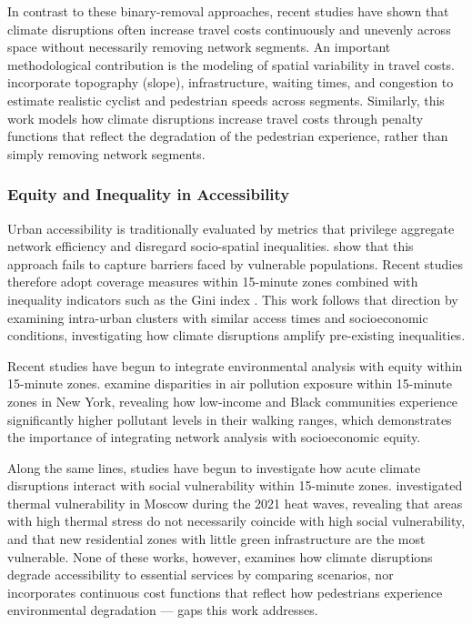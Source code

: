 In contrast to these binary-removal approaches, recent studies have shown that climate disruptions often increase travel costs continuously and unevenly across space without necessarily removing network segments. An important methodological contribution is the modeling of spatial variability in travel costs. \cite{PRITCHARD2019386} incorporate topography (slope), infrastructure, waiting times, and congestion to estimate realistic cyclist and pedestrian speeds across segments. Similarly, this work models how climate disruptions increase travel costs through penalty functions that reflect the degradation of the pedestrian experience, rather than simply removing network segments.

\subsubsection{Equity and Inequality in Accessibility}

Urban accessibility is traditionally evaluated by metrics that privilege aggregate network efficiency and disregard socio-spatial inequalities. \cite{FolGallez2014} show that this approach fails to capture barriers faced by vulnerable populations. Recent studies therefore adopt coverage measures within 15-minute zones combined with inequality indicators such as the Gini index \cite{Bruno2024}. This work follows that direction by examining intra-urban clusters with similar access times and socioeconomic conditions, investigating how climate disruptions amplify pre-existing inequalities.

Recent studies have begun to integrate environmental analysis with equity within 15-minute zones. \cite{smartcities8020053} examine disparities in air pollution exposure within 15-minute zones in New York, revealing how low-income and Black communities experience significantly higher pollutant levels in their walking ranges, which demonstrates the importance of integrating network analysis with socioeconomic equity.

Along the same lines, studies have begun to investigate how acute climate disruptions interact with social vulnerability within 15-minute zones. \cite{Shartova2024} investigated thermal vulnerability in Moscow during the 2021 heat waves, revealing that areas with high thermal stress do not necessarily coincide with high social vulnerability, and that new residential zones with little green infrastructure are the most vulnerable. None of these works, however, examines how climate disruptions degrade accessibility to essential services by comparing scenarios, nor incorporates continuous cost functions that reflect how pedestrians experience environmental degradation — gaps this work addresses.

